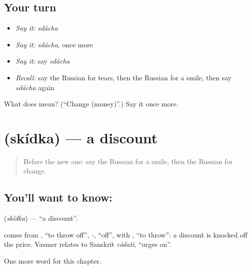 \subsection*{Your turn}
\begin{itemize}
\raggedright
  \item \emph{Say it:} \emph{sdácha}
  \item \emph{Say it:} \emph{sdácha}, once more
  \item \emph{Say it:} say \emph{sdácha}
  \item \emph{Recall:} say the Russian for tears, then the Russian for a smile, then say \emph{sdácha} again
\end{itemize}

\begin{tcolorbox}[breakable,colback=teal!4,colframe=teal!35!black,title={Before you move on}]
What does  mean? (\textquotedblleft{}Change (money)\textquotedblright{}.) Say it once more.
\end{tcolorbox}
\section[\texorpdfstring{\ru{скидка} (skídka)}{скидка (skídka)}]{ (skídka) — a discount}

\label{lesson:RU-C201-skidka}



\begin{quote}
Before the new one: say the Russian for a smile, then the Russian for change.
\end{quote}

\subsection*{You'll want to know: }
\textbf{} (\emph{skídka}) — \textquotedblleft{}a discount\textquotedblright{}.

\begin{cousinweb}
\textbf{} comes from \emph{}, \textquotedblleft{}to throw off\textquotedblright{}, \emph{-}, \textquotedblleft{}off\textquotedblright{}, with \emph{}, \textquotedblleft{}to throw\textquotedblright{}: a discount is knocked off the price. Vasmer relates \emph{} to Sanskrit \emph{códati}, \textquotedblleft{}urges on\textquotedblright{}.
\end{cousinweb}

\begin{grammarlens}[title={What you've built}]
One more word for this chapter.
\end{grammarlens}

